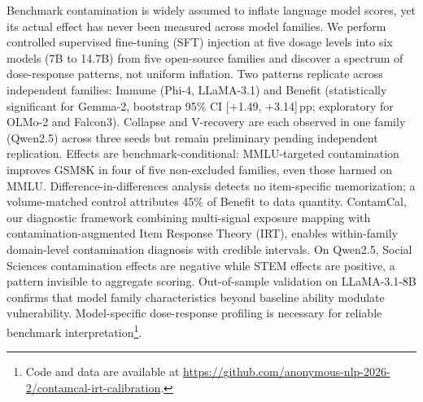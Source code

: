 Benchmark contamination is widely assumed to inflate language model scores, yet its actual effect has never been measured across model families. We perform controlled supervised fine-tuning (SFT) injection at five dosage levels into six models (7B to 14.7B) from five open-source families and discover a spectrum of dose-response patterns, not uniform inflation. Two patterns replicate across independent families: Immune (Phi-4, LLaMA-3.1) and Benefit (statistically significant for Gemma-2, bootstrap 95\% CI [$+$1.49, $+$3.14]\,pp; exploratory for OLMo-2 and Falcon3). Collapse and V-recovery are each observed in one family (Qwen2.5) across three seeds but remain preliminary pending independent replication. Effects are benchmark-conditional: MMLU-targeted contamination improves GSM8K in four of five non-excluded families, even those harmed on MMLU. Difference-in-differences analysis detects no item-specific memorization; a volume-matched control attributes 45\% of Benefit to data quantity. ContamCal, our diagnostic framework combining multi-signal exposure mapping with contamination-augmented Item Response Theory (IRT), enables within-family domain-level contamination diagnosis with credible intervals. On Qwen2.5, Social Sciences contamination effects are negative while STEM effects are positive, a pattern invisible to aggregate scoring. Out-of-sample validation on LLaMA-3.1-8B confirms that model family characteristics beyond baseline ability modulate vulnerability. Model-specific dose-response profiling is necessary for reliable benchmark interpretation\footnote{Code and data are available at \url{https://github.com/anonymous-nlp-2026-2/contamcal-irt-calibration}.}.
